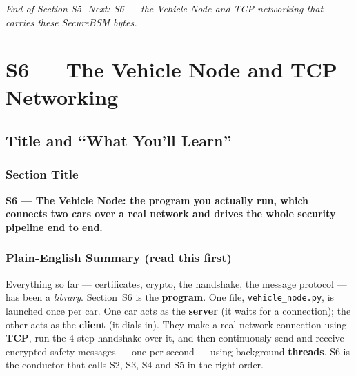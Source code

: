\documentclass[11pt,a4paper]{report}
\begin{document}
\vfill
\begin{center}\footnotesize\itshape
End of Section S5. Next: S6 --- the Vehicle Node and TCP networking that carries
these SecureBSM bytes.
\end{center}



\chapter{S6 --- The Vehicle Node and TCP Networking}

\section{Title and ``What You'll Learn''}

\subsection*{Section Title}
\textbf{S6 --- The Vehicle Node: the program you actually run, which connects two
cars over a real network and drives the whole security pipeline end to end.}

\subsection*{Plain-English Summary (read this first)}
Everything so far --- certificates, crypto, the handshake, the message protocol
--- has been a \emph{library}. Section~S6 is the \textbf{program}. One file,
\texttt{vehicle\_node.py}, is launched once per car. One car acts as the
\textbf{server} (it waits for a connection); the other acts as the
\textbf{client} (it dials in). They make a real network connection using
\textbf{TCP}, run the 4-step handshake over it, and then continuously send and
receive encrypted safety messages --- one per second --- using background
\textbf{threads}. S6 is the conductor that calls S2, S3, S4 and S5 in the right
order.
\end{document}
